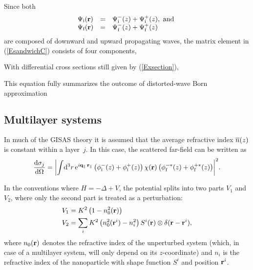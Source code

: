 Since both
\begin{equation}
  \begin{array}{lcl}
  \Psi_\text{i}(\mathbf{r})
  &=& \Psi^-_\text{i}(z) + \Psi^+_\text{i}(z), \text{ and }
  \\
  \Psi_\text{f}(\mathbf{r})
  &=& \Psi^-_\text{f}(z) + \Psi^+_\text{f}(z)
   \end{array}
\end{equation}
are composed of downward and upward propagating waves,
the matrix element in (\ref{EsandwichC}) consists of four components,

With differential cross sections still given by (\ref{Exsection}),

This equation fully summarizes the outcome of
distorted-wave Born approximation


\subsection{Multilayer systems}

In much of the GISAS theory it is assumed
that the average refractive index $\overline{n}(z)$ is constant within a layer~$j$.
In this case, the scattered far-field
can be written as
\begin{equation}\label{Ecross3}
  \frac{{\rm d}\sigma_j}{{\rm d}\Omega}
  = {\left|
    \int\!{\rm d}^3r\, {\rm e}^{i\mathbf{q}_\parallel\,\mathbf{r}_\parallel}
    \left(\phi^-_\text{i}(z) + \phi^+_\text{i}(z)\right)
    \chi(\mathbf{r})
    \left(\phi^{-*}_\text{f}(z) + \phi^{+*}_\text{f}(z)\right)
    \right|}^2.
\end{equation}


In the conventions where $H=-\Delta + V$, the potential splits into two parts $V_1$ and $V_2$, where only the second part is treated as a perturbation:
\begin{align*}
  V_1 & = K^2\left( 1-n_0^2(\mathbf{r})\right)  \\
  V_2 & = \sum_i K^2\left( n_0^2(\mathbf{r}^i) - n_i^2 \right) S^i(\mathbf{r}) \otimes \delta(\mathbf{r}-\mathbf{r}^i),
\end{align*}
where $n_0(\mathbf{r})$ denotes the refractive index of the unperturbed system (which, in case of a multilayer system, will only depend on its $z$-coordinate) and $n_i$ is the refractive index of the nanoparticle with shape function $S^i$ and position $\mathbf{r}^i$.

